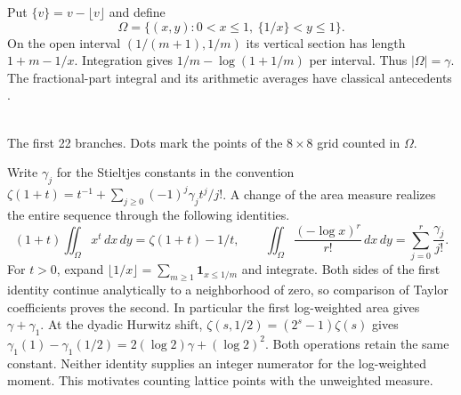 \documentclass[11pt,a4paper,oneside,openany]{report}
\theoremstyle{remark}\newtheorem{remark}[theorem]{Remark}
\numberwithin{equation}{section}
\begin{document}
Put $\{v\}=v-\lfloor v\rfloor$ and define
\[
 \Omega=\{(x,y):0<x\le1,\ \{1/x\}<y\le1\}.
\]
On the open interval $(1/(m+1),1/m)$ its vertical section has length $1+m-1/x$. Integration gives $1/m-\log(1+1/m)$ per interval. Thus $|\Omega|=\gamma$. The fractional-part integral and its arithmetic averages have classical antecedents \cite{lagarias,pill}.
\begin{center}
\\[-1pt]
{\small The first 22 branches. Dots mark the points of the $8\times8$ grid counted in $\Omega$.}
\end{center}
Write $\gamma_j$ for the Stieltjes constants in the convention $\zeta(1+t)=t^{-1}+\sum_{j\ge0}(-1)^j\gamma_jt^j/j!$. A change of the area measure realizes the entire sequence through the following identities.
\begin{equation}\label{ch4:eq:mell}
 (1+t)\iint_\Omega x^t\,dx\,dy=\zeta(1+t)-1/t,\qquad
 \iint_\Omega\frac{(-\log x)^r}{r!}\,dx\,dy=\sum_{j=0}^r\frac{\gamma_j}{j!}.
\end{equation}
For $t>0$, expand $\lfloor1/x\rfloor=\sum_{m\ge1}\mathbf1_{x\le1/m}$ and integrate. Both sides of the first identity continue analytically to a neighborhood of zero, so comparison of Taylor coefficients proves the second. In particular the first log-weighted area gives $\gamma+\gamma_1$. At the dyadic Hurwitz shift, $\zeta(s,1/2)=(2^s-1)\zeta(s)$ gives
$\gamma_1(1)-\gamma_1(1/2)=2(\log2)\gamma+(\log2)^2$. Both operations retain the same constant. Neither identity supplies an integer numerator for the log-weighted moment. This motivates counting lattice points with the unweighted measure.
\end{document}
